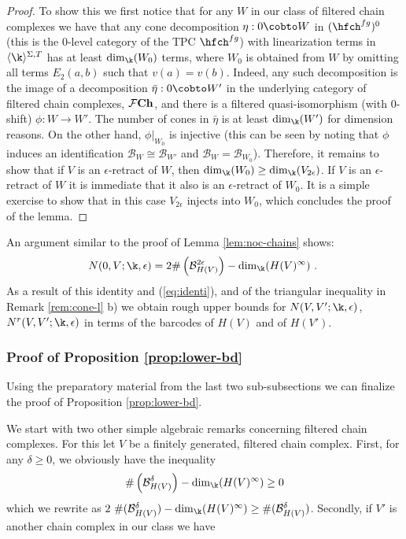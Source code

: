 \begin{proof}
To show this we first notice that for any $W$ in our class of filtered
chain complexes we have that any cone decomposition $\eta:0\cobto W$
in $(\hfch^{fg})^{0}$ (this is the $0$-level category of the
TPC $\hfch^{fg}$) with linearization terms in
$\langle\k\rangle^{\Sigma,T}$ has at least $\dim_{\k}(W_{0})$ terms,
where $W_{0}$ is obtained from $W$ by omitting all terms
  $E_{2}(a,b)$ such that $v(a)=v(b)$. Indeed, any such decomposition
is the image of a decomposition $\bar{\eta}:0\cobto W'$ in the
underlying category of filtered chain complexes,
$\mathcal{F}{\bf Ch}$, and there is a filtered quasi-isomorphism (with
$0$-shift) $\phi:W\to W'$.  The number of cones in $\bar{\eta}$ is at
least $\dim_{\k}(W')$ for dimension reasons. On the other hand,
$\phi|_{W_{0}}$ is injective (this can be seen by noting that $\phi$
induces an identification $\mathcal{B}_{W}\cong \mathcal{B}_{W'}$ and
$\mathcal{B}_{W}=\mathcal{B}_{W_{0}}$).  Therefore, it remains to show
that if $V$ is an $\epsilon$-retract of $W$, then
$\dim_{\k}(W_{0})\geq \dim_{\k}(V_{2\epsilon})$. If $V$ is an
$\epsilon$-retract of $W$ it is immediate that it also is an
$\epsilon$-retract of $W_{0}$. It is a simple exercise to show that
in this case $V_{2\epsilon}$ injects into $W_{0}$, which concludes
the proof of the lemma.
\end{proof}

\begin{rem}\label{rem:another-ineq}
  An argument similar to the proof of Lemma \ref{lem:noc-chains}
  shows: 
    \begin{equation}\label{eq:identi2} N(0,V;\k,\epsilon)= 2\#
      \left(
      \mathcal{B}^{2\epsilon}_{H(V)}\right) - \dim_{\k} (H(V)^{\infty})~.~
  \end{equation}
 As a result of this identity and (\ref{eq:identi}), and of the
triangular inequality in Remark \ref{rem:cone-l} b) we obtain rough
upper bounds for $N(V,V'; \k,\epsilon)$,
$N^{r}(V,V';\k,\epsilon)$ in terms of the barcodes of
$H(V)$ and of $H(V')$.
\end{rem}


\subsubsection{Proof of Proposition \ref{prop:lower-bd}}
\label{subsec:proof_Prop}
Using the preparatory material from the last two sub-subsections 
we can finalize the proof of Proposition \ref{prop:lower-bd}.

We start with two other simple algebraic remarks concerning filtered
chain complexes. For this let $V$ be a finitely generated, filtered
chain complex.  First, for any $\delta\geq 0$, we obviously have
the inequality
  $$ \#\left( \mathcal{B}^{\delta}_{H(V)}\right)
  - \dim_{\k}(H(V)^{\infty})\geq 0$$ which we rewrite as
$2 \ \#(\mathcal{B}^{\delta}_{H(V)})
  -\dim_{\k}(H(V)^{\infty})\geq \#(\mathcal{B}^{\delta}_{H(V)})$.
Secondly, if $V'$ is another chain complex in our class we have

